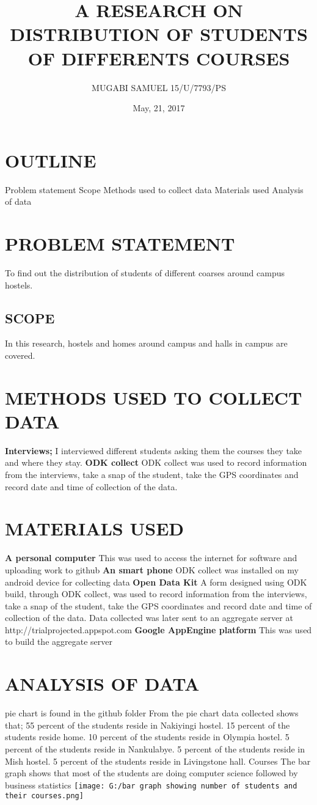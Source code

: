 \documentclass[12pt]{article}
\begin{document}
\title{A RESEARCH ON DISTRIBUTION OF STUDENTS OF DIFFERENTS COURSES }
\author{MUGABI SAMUEL 15/U/7793/PS}
\date{May, 21, 2017}
\maketitle

\section{OUTLINE}
Problem statement		Scope		Methods used to collect data	Materials used 	Analysis of data
\section{PROBLEM STATEMENT}
To find out  the distribution of students of different coarses around campus hostels.

\subsection{SCOPE}
In this research, hostels and homes around campus and halls in campus are covered. 

\section{METHODS USED TO COLLECT DATA}
\textbf{Interviews;}
I interviewed different students asking them the courses they take and where they stay.
\textbf{ODK collect}
ODK collect was used to record information from the interviews, take a snap of the student, take the GPS coordinates and record date and time of collection of the data. 

\section{MATERIALS USED}
\textbf{A personal computer}
This was used to access the internet for software and uploading work to github
\textbf{An smart phone}
ODK collect was installed on my android device for collecting data
\textbf{Open Data Kit}
A form designed using ODK build, through ODK collect, was used to record information from the interviews, take a snap of the student, take the GPS coordinates and record date and time of collection of the data. Data collected was later sent to an aggregate server at http://trialprojected.appspot.com
\textbf{Google AppEngine platform}
This was used to build the aggregate server

\section{ANALYSIS OF DATA}
pie chart is found in the github folder
From the pie chart data collected shows that;
 55 percent of the students reside in Nakiyingi hostel.
15 percent of the students reside home.
10 percent of the students reside in Olympia hostel.
5 percent of the students reside in Nankulabye.
5 percent of the students reside in Mish hostel.
5 percent of the students reside in Livingstone hall.
Courses
The bar graph shows that most of the students are doing computer science followed by business statistics
\texttt{[image: G:/bar graph showing number of students and their courses.png]}
\end{document}

